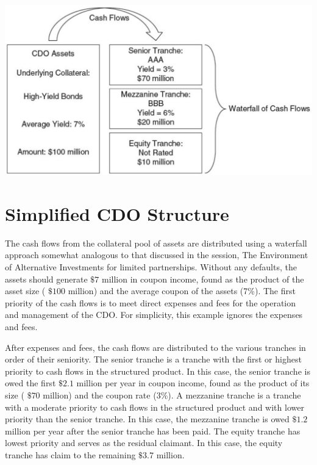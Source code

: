 \documentclass[11pt]{article}
\begin{document}
\begin{center}
\includegraphics[max width=\textwidth]{2024_04_09_feb3065896628696873eg-2}
\end{center}

\section*{Simplified CDO Structure}
The cash flows from the collateral pool of assets are distributed using a waterfall approach somewhat analogous to that discussed in the session, The Environment of Alternative Investments for limited partnerships. Without any defaults, the assets should generate $\$ 7$ million in coupon income, found as the product of the asset size ( $\$ 100$ million) and the average coupon of the assets (7\%). The first priority of the cash flows is to meet direct expenses and fees for the operation and management of the CDO. For simplicity, this example ignores the expenses and fees.

After expenses and fees, the cash flows are distributed to the various tranches in order of their seniority. The senior tranche is a tranche with the first or highest priority to cash flows in the structured product. In this case, the senior tranche is owed the first $\$ 2.1$ million per year in coupon income, found as the product of its size ( $\$ 70$ million) and the coupon rate (3\%). A mezzanine tranche is a tranche with a moderate priority to cash flows in the structured product and with lower priority than the senior tranche. In this case, the mezzanine tranche is owed $\$ 1.2$ million per year after the senior tranche has been paid. The equity tranche has lowest priority and serves as the residual claimant. In this case, the equity tranche has claim to the remaining $\$ 3.7$ million.
\end{document}
